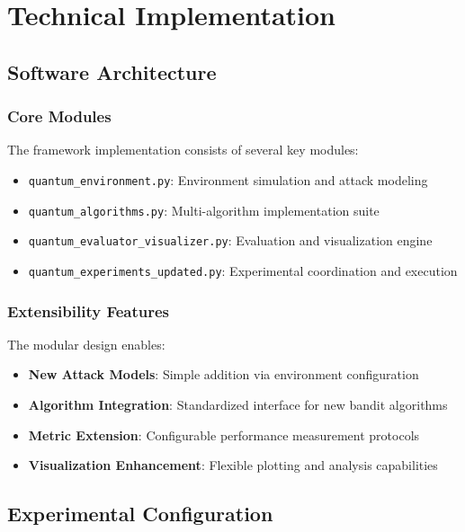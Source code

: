\documentclass[11pt,a4paper]{article}
\begin{document}
\section{Technical Implementation}

\subsection{Software Architecture}

\subsubsection{Core Modules}

The framework implementation consists of several key modules:

\begin{itemize}
\item \texttt{quantum\_environment.py}: Environment simulation and attack modeling
\item \texttt{quantum\_algorithms.py}: Multi-algorithm implementation suite
\item \texttt{quantum\_evaluator\_visualizer.py}: Evaluation and visualization engine
\item \texttt{quantum\_experiments\_updated.py}: Experimental coordination and execution
\end{itemize}

\subsubsection{Extensibility Features}

The modular design enables:

\begin{itemize}
\item \textbf{New Attack Models}: Simple addition via environment configuration
\item \textbf{Algorithm Integration}: Standardized interface for new bandit algorithms
\item \textbf{Metric Extension}: Configurable performance measurement protocols
\item \textbf{Visualization Enhancement}: Flexible plotting and analysis capabilities
\end{itemize}

\subsection{Experimental Configuration}
\end{document}
